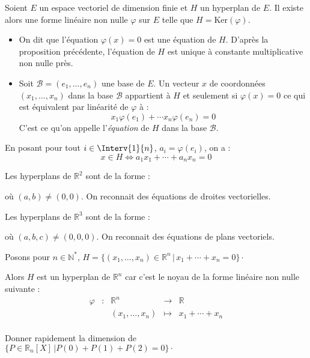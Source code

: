 \documentclass[a4paper,10pt]{report}
\begin{document}
\newpage

$\phantom{test}$

\vspace{3cm}

\begin{TheoremeDefinition}{} Soient $E$ un espace vectoriel de dimension finie et $H$ un hyperplan de $E$. Il existe alors une forme linéaire non nulle $\varphi$ sur $E$ telle que $H = \textrm{Ker}(\varphi)$. 

\begin{itemize}
\item On dit que l'équation $\varphi(x)=0$ est une équation de $H$. D'après la proposition précédente, l'équation de $H$ est unique à constante multiplicative non nulle près.
\item Soit $\mathcal{B}=(e_1, \ldots, e_n)$ une base de $E$. Un vecteur $x$ de coordonnées $(x_1, \ldots, x_n)$ dans la base $\mathcal{B}$ appartient à $H$ et seulement si $\varphi(x)=0$ ce qui est équivalent par linéarité de $\varphi$ à :
$$x_1 \varphi(e_1) + \cdots x_n \varphi(e_n) = 0$$
C'est ce qu'on appelle l'\emph{équation} de $H$ dans la base $\mathcal{B}$.
\end{itemize}
\end{TheoremeDefinition}

\begin{Remarque}{} En posant pour tout $i \in \Interv{1}{n}$, $a_i = \varphi(e_i)$, on a :
$$ x \in H \Longleftrightarrow a_1 x_1 + \cdots + a_n x_n = 0$$
\end{Remarque}

\begin{exems}
\item Les hyperplans de $\mathbb{R}^2$ sont de la forme :

\vspace{1cm}

où $(a,b) \neq (0,0)$. On reconnait des équations de droites vectorielles.
\item  Les hyperplans de $\mathbb{R}^3$ sont de la forme :

\vspace{1cm
}
où $(a,b,c) \neq (0,0,0)$. On reconnait des équations de plans vectoriels.
\item Posons pour $n \in \mathbb{N}^*$, $H = \lbrace (x_1, \ldots, x_n) \in \mathbb{R}^n \, \vert \, x_1 + \cdots + x_n = 0 \rbrace \cdot$

Alors $H$ est un hyperplan de $\mathbb{R}^n$ car c'est le noyau de la forme linéaire non nulle suivante :
$$ \begin{array}{ccccl}
\varphi & : & \mathbb{R}^n  & \rightarrow & \mathbb{R} \\
& & (x_1, \ldots, x_n) & \mapsto &  x_1 + \cdots + x_n \\
\end{array}$$
\end{exems}

\begin{ApplicationDirecte} Donner rapidement la dimension de $\lbrace P \in \mathbb{R}_n[X] \, \vert P(0)+P(1)+P(2)= 0 \rbrace\cdot$ \end{ApplicationDirecte}
\end{document}
